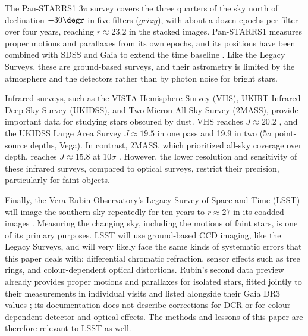 \documentclass[usenatbib]{mnras}   %
\begin{document}
The Pan-STARRS1 $3\pi$ survey \citep{PanSTARRS_2016} covers the three quarters of the sky north of declination $-30\degr$ in five filters ($grizy$), with about a dozen epochs per filter over four years, reaching $r \approx 23.2$ in the stacked images. Pan-STARRS1 measures proper motions and parallaxes from its own epochs, and its positions have been combined with SDSS and Gaia to extend the time baseline \citep[e.g.][]{Tian_2017}. Like the Legacy Surveys, these are ground-based surveys, and their astrometry is limited by the atmosphere and the detectors rather than by photon noise for bright stars.

Infrared surveys, such as the VISTA Hemisphere Survey (VHS), UKIRT Infrared Deep Sky Survey (UKIDSS), and Two Micron All-Sky Survey (2MASS), provide important data for studying stars obscured by dust. VHS reaches $J \approx 20.2$ \citep{VHS}, and the UKIDSS Large Area Survey $J \approx 19.5$ in one pass and 19.9 in two \citep{UKIDSS_2007} (5$\sigma$ point-source depths, Vega). In contrast, 2MASS, which prioritized all-sky coverage over depth, reaches $J \approx 15.8$ at 10$\sigma$ \citep{2MASS_2003}. However, the lower resolution and sensitivity of these infrared surveys, compared to optical surveys, restrict their precision, particularly for faint objects.

Finally, the Vera Rubin Observatory's Legacy Survey of Space and Time (LSST) will image the southern sky repeatedly for ten years to $r \approx 27$ in its coadded images \citep{Rubin2019}. Measuring the changing sky, including the motions of faint stars, is one of its primary purposes. LSST will use ground-based CCD imaging, like the Legacy Surveys, and will very likely face the same kinds of systematic errors that this paper deals with: differential chromatic refraction, sensor effects such as tree rings, and colour-dependent optical distortions. Rubin's second data preview already provides proper motions and parallaxes for isolated stars, fitted jointly to their measurements in individual visits and listed alongside their Gaia DR3 values \citep{RubinDP2}; its documentation does not describe corrections for DCR or for colour-dependent detector and optical effects. The methods and lessons of this paper are therefore relevant to LSST as well.

\end{document}
